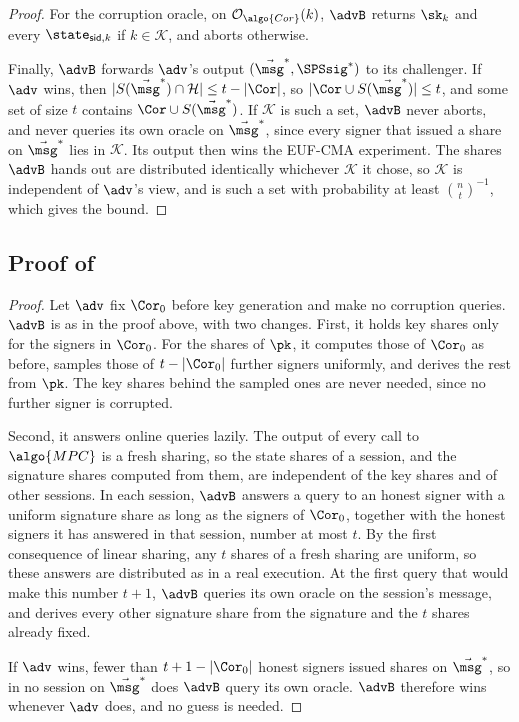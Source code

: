 \begin{proof}
  For the corruption oracle, on $\mathcal{O}_{\algo{Cor}}(k)$, $\advB$
returns $\sk_k$ and every $\state_{\mathsf{sid},k}$ if $k \in \mathcal{K}$, and
aborts otherwise.

  Finally, $\advB$ forwards $\adv$'s output $(\vec{\msg}^*,
\SPSsig^*)$ to its challenger. If $\adv$ wins, then $|S(\vec{\msg}^*) \cap
\mathcal{H}| \leq t - |\Cor|$, so $|\Cor \cup S(\vec{\msg}^*)| \leq t$, and some
set of size $t$ contains $\Cor \cup S(\vec{\msg}^*)$. If $\mathcal{K}$ is such a
set, $\advB$ never aborts, and never queries its own oracle on $\vec{\msg}^*$,
since every signer that issued a share on $\vec{\msg}^*$ lies in $\mathcal{K}$.
Its output then wins the EUF-CMA experiment. The shares $\advB$ hands out are
distributed identically whichever $\mathcal{K}$ it chose, so $\mathcal{K}$ is
independent of $\adv$'s view, and is such a set with probability at least
$\binom{n}{t}^{-1}$, which gives the bound.

\end{proof}

\subsection{Proof of }\label{sec:tsps-static}

\begin{proof}

  Let $\adv$ fix $\Cor_0$ before key generation and make no corruption queries.
$\advB$ is as in the proof above, with two changes. First, it holds key shares only for the signers in $\Cor_0$. For the
shares of $\pk$, it computes those of $\Cor_0$ as before, samples those of $t -
|\Cor_0|$ further signers uniformly, and derives the rest from $\pk$. The key
shares behind the sampled ones are never needed, since no further signer is
corrupted.

Second, it answers online queries lazily. The output of every call to
$\algo{MPC}$ is a fresh sharing, so the state shares of a session, and the
signature shares computed from them, are independent of the key shares and of
other sessions. In each session, $\advB$ answers a query to an honest signer with
a uniform signature share as long as the signers of $\Cor_0$, together with the
honest signers it has answered in that session, number at most $t$. By the first consequence of linear sharing,
any $t$ shares of a fresh sharing are uniform, so these answers are distributed
as in a real execution. At the first query that would make this number $t+1$,
$\advB$ queries its own oracle on the session's message, and derives every other
signature share from the signature and the $t$ shares already fixed.

If $\adv$ wins, fewer than $t + 1 - |\Cor_0|$ honest signers issued shares on
$\vec{\msg}^*$, so in no session on $\vec{\msg}^*$ does $\advB$ query its own
oracle. $\advB$ therefore wins whenever $\adv$ does, and no guess is needed.

\end{proof}

